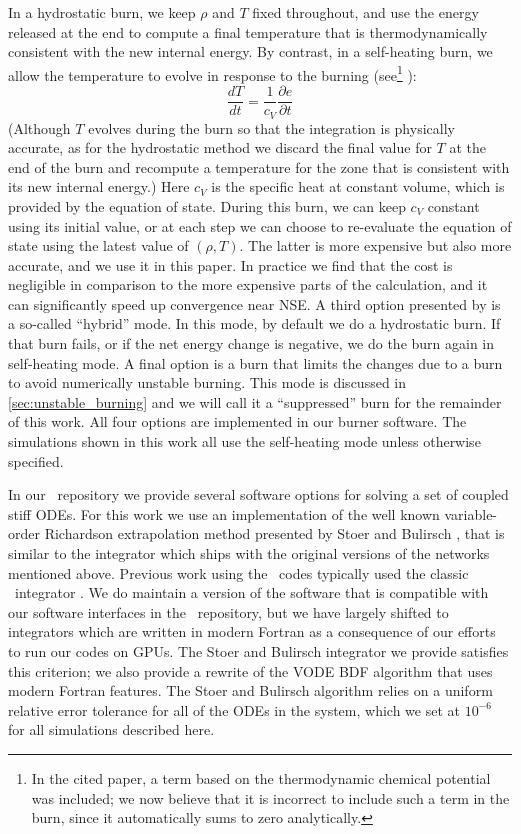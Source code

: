 \documentclass[12pt]{article}
\begin{document}
In a hydrostatic burn, we keep $\rho$ and $T$ fixed throughout, and use
the energy released at the end to compute a final temperature that is
thermodynamically consistent with the new internal energy. By contrast,
in a self-heating burn, we allow the temperature to evolve in response
to the burning (see\footnote{In the cited paper, a term based on the
thermodynamic chemical potential was included; we now believe
that it is incorrect to include such a term in the burn, since it
automatically sums to zero analytically.} \citet{maestro3}):
\begin{equation}
  \frac{dT}{dt} = \frac{1}{c_V}\frac{\partial e}{\partial t}
\end{equation}
(Although $T$ evolves during the burn so that the integration is physically
accurate, as for the hydrostatic method we discard the final value
for $T$ at the end of the burn and recompute a temperature for the zone that is
consistent with its new internal energy.) Here $c_V$ is the specific heat at
constant volume, which is provided by the equation of state.  During this burn,
we can keep $c_V$ constant using its initial value, or at each step we
can choose to re-evaluate the equation of state using the latest value of $(\rho, T)$.
The latter is more expensive but also more accurate, and we use it in this paper.
In practice we find that the cost is negligible in comparison to the more expensive
parts of the calculation, and it can significantly speed up convergence near NSE.
A third option presented by \citet{raskin:2010} is a so-called ``hybrid'' mode.
In this mode, by default we do a hydrostatic burn. If that burn fails, or if the net
energy change is negative, we do the burn again in self-heating mode. A final option
is a burn that limits the changes due to a burn to avoid numerically unstable burning.
This mode is discussed in \autoref{sec:unstable_burning} and we will call it a
``suppressed'' burn for the remainder of this work. All four options
are implemented in our burner software. The simulations shown in this work all
use the self-heating mode unless otherwise specified.

In our \microphysics\ repository we provide several software options for
solving a set of coupled stiff ODEs. For this work we use an implementation of
the well known variable-order Richardson extrapolation method presented by Stoer and
Bulirsch \cite{stoer:1980}, that is similar to the integrator which ships with
the original versions of the networks mentioned above. Previous work using the \boxlib\
codes typically used the classic \vode\ integrator \cite{vode}. We do maintain a version
of the software that is compatible with our software interfaces in the \microphysics\
repository, but we have largely shifted to integrators which are written in modern
Fortran as a consequence of our efforts to run our codes on GPUs. The Stoer and Bulirsch
integrator we provide satisfies this criterion; we also provide a rewrite of the VODE
BDF algorithm that uses modern Fortran features. The Stoer and Bulirsch algorithm
relies on a uniform relative error tolerance for all of the ODEs in the system, which
we set at $10^{-6}$ for all simulations described here.
\end{document}
